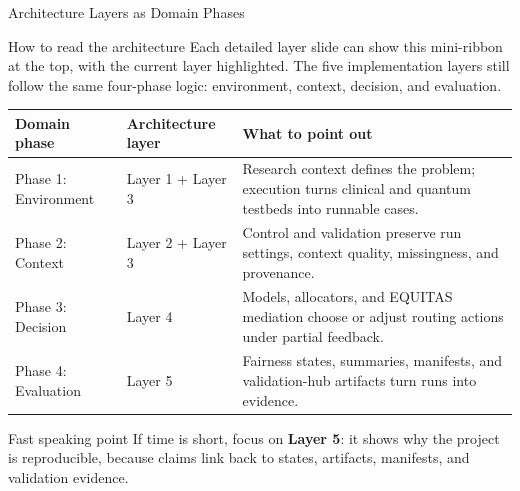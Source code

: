 \begin{frame}{Architecture Layers as Domain Phases}
\small

\begin{block}{How to read the architecture}
Each detailed layer slide can show this mini-ribbon at the top, with the current layer highlighted. The five implementation layers still follow the same four-phase logic: environment, context, decision, and evaluation.
\end{block}

\vspace{0.2em}
\vspace{0.1em}

\begin{tabular}{p{}p{}p{}}
\toprule
\textbf{Domain phase} & \textbf{Architecture layer} & \textbf{What to point out} \\
\midrule
\rowcolor{phase1blue!12}
Phase 1: Environment & Layer 1 + Layer 3 & Research context defines the problem; execution turns clinical and quantum testbeds into runnable cases. \\

\rowcolor{phase2green!12}
Phase 2: Context & Layer 2 + Layer 3 & Control and validation preserve run settings, context quality, missingness, and provenance. \\

\rowcolor{phase3orange!12}
Phase 3: Decision & Layer 4 & Models, allocators, and EQUITAS mediation choose or adjust routing actions under partial feedback. \\

\rowcolor{phase4purple!12}
Phase 4: Evaluation & Layer 5 & Fairness states, summaries, manifests, and validation-hub artifacts turn runs into evidence. \\
\bottomrule
\end{tabular}

\vspace{0.3em}

\begin{block}{Fast speaking point}
If time is short, focus on \textbf{Layer 5}: it shows why the project is reproducible, because claims link back to states, artifacts, manifests, and validation evidence.
\end{block}

\end{frame}
